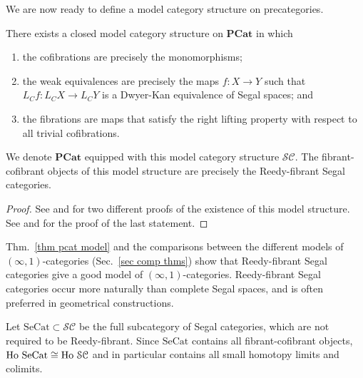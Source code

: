\begin{refsection}
We are now ready to define a model category structure on precategories.

\begin{thm}\label{thm pcat model}
There exists a closed model category structure on $\mathbf{PCat}$ in which
\begin{enumerate}
\item the cofibrations are precisely the monomorphisms;
\item the weak equivalences are precisely the maps $f:X\to Y$ such that $L_Cf:L_CX\to L_CY$ is a Dwyer-Kan equivalence of Segal spaces; and
\item the fibrations are maps that satisfy the right lifting property with respect to all trivial cofibrations.
\end{enumerate}
We denote $\mathbf{PCat}$ equipped with this model category structure $\mathcal{SC}$. The fibrant-cofibrant objects of this model structure are precisely the Reedy-fibrant Segal categories.
\end{thm}
\begin{proof}
See \cite[Thm 2.3]{hirschowitz-simpson-descente-pour-les-n-champs} and \cite[Thm 5.1]{bergner-three-models-for-the-homotopy-theory-of-homotopy-theories} for two different proofs of the existence of this model structure. See \cite[Cor 5.13]{bergner-three-models-for-the-homotopy-theory-of-homotopy-theories} and \cite[Thm 3.2]{bergner-characterization-of-fibrant-segal-categories} for the proof of the last statement.
\end{proof}

Thm.~\ref{thm pcat model} and the comparisons between the different models of $(\infty,1)$-categories (Sec.~\ref{sec comp thms}) show that Reedy-fibrant Segal categories give a good model of $(\infty,1)$-categories. Reedy-fibrant Segal categories occur more naturally than complete Segal spaces, and is often preferred in geometrical constructions.

Let $\mathrm{SeCat}\subset\mathcal{SC}$ be the full subcategory of Segal categories, which are not required to be Reedy-fibrant. Since $\mathrm{SeCat}$ contains all fibrant-cofibrant objects, $\operatorname{\mathrm{Ho} \,}\mathrm{SeCat}\cong\operatorname{\mathrm{Ho} \,}\mathcal{SC}$ and in particular contains all small homotopy limits and colimits.


\end{refsection}
